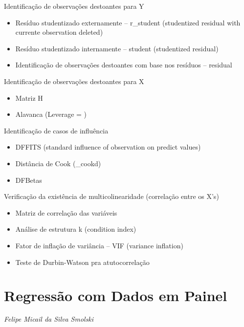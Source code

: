 \documentclass[12pt,brazil,oneside]{book}
\providecommand{\tightlist}{%
  \setlength{\itemsep}{0pt}\setlength{\parskip}{0pt}}
\begin{document}
Identificação de observações destoantes para Y

\begin{itemize}
\tightlist
\item
  Resíduo studentizado externamente -- r\_student (studentized residual with currente observation deleted)
\item
  Resíduo studentizado internamente -- student (studentized residual)
\item
  Identificação de observações destoantes com base nos resíduos -- residual
\end{itemize}

Identificação de observações destoantes para X

\begin{itemize}
\tightlist
\item
  Matriz H
\item
  Alavanca (Leverage = )
\end{itemize}

Identificação de casos de influência

\begin{itemize}
\tightlist
\item
  DFFITS (standard influence of observation on predict values)
\item
  Distância de Cook (\_cookd)
\item
  DFBetas
\end{itemize}

Verificação da existência de multicolinearidade (correlação entre os X's)

\begin{itemize}
\tightlist
\item
  Matriz de correlação das variáveis
\item
  Análise de estrutura k (condition index)
\item
  Fator de inflação de variância -- VIF (variance inflation)
\item
  Teste de Durbin-Watson pra atutocorrelação
\end{itemize}

\hypertarget{regressao-com-dados-em-painel}{%
\chapter{Regressão com Dados em Painel}\label{regressao-com-dados-em-painel}}

\emph{Felipe Micail da Silva Smolski}

\begin{flushright}
\emph{}
\end{flushright}
\end{document}
